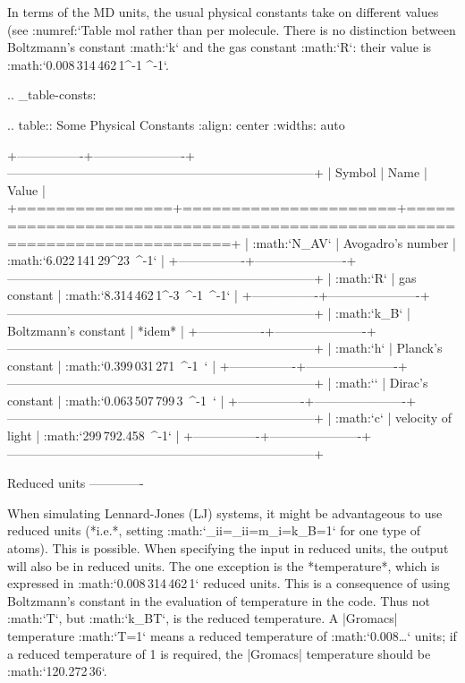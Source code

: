 In terms of the MD units, the usual physical constants take on different
values (see :numref:`Table %
mol rather than per molecule. There is no distinction between
Boltzmann’s constant :math:`k` and the gas constant :math:`R`: their
value is :math:`0.008\,314\,462\,1^{-1} ^{-1}`.

.. _table-consts:

.. table:: 
    Some Physical Constants
    :align: center
    :widths: auto

    +----------------+----------------------+--------------------------------------------------------------------------+
    | Symbol         | Name                 | Value                                                                    |
    +================+======================+==========================================================================+
    | :math:`N_{AV}` | Avogadro's number    | :math:`6.022\,141\,29^{23}~^{-1}`                   |
    +----------------+----------------------+--------------------------------------------------------------------------+
    | :math:`R`      | gas constant         | :math:`8.314\,462\,1^{-3}~^{-1}~^{-1}` |
    +----------------+----------------------+--------------------------------------------------------------------------+
    | :math:`k_B`    | Boltzmann's constant | *idem*                                                                   |
    +----------------+----------------------+--------------------------------------------------------------------------+
    | :math:`h`      | Planck's constant    | :math:`0.399\,031\,271~^{-1}~`                 |
    +----------------+----------------------+--------------------------------------------------------------------------+
    | :math:`\hbar`  | Dirac's constant     | :math:`0.063\,507\,799\,3~^{-1}~`              |
    +----------------+----------------------+--------------------------------------------------------------------------+
    | :math:`c`      | velocity of light    | :math:`299\,792.458~^{-1}`                                 |
    +----------------+----------------------+--------------------------------------------------------------------------+



Reduced units
-------------

When simulating Lennard-Jones (LJ) systems, it might be advantageous to
use reduced units (*i.e.*, setting
:math:`\epsilon_{ii}=\sigma_{ii}=m_i=k_B=1` for one type of atoms). This
is possible. When specifying the input in reduced units, the output will
also be in reduced units. The one exception is the *temperature*, which
is expressed in :math:`0.008\,314\,462\,1` reduced units. This is a
consequence of using Boltzmann’s constant in the evaluation of
temperature in the code. Thus not :math:`T`, but :math:`k_BT`, is the
reduced temperature. A |Gromacs| temperature :math:`T=1` means a reduced
temperature of :math:`0.008\ldots` units; if a reduced temperature of 1
is required, the |Gromacs| temperature should be :math:`120.272\,36`.

